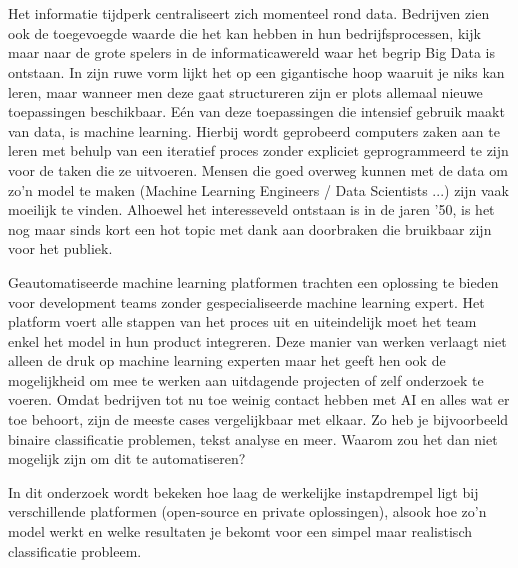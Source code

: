
\chapter{}
\label{ch:inleiding}

Het informatie tijdperk centraliseert zich momenteel rond data. Bedrijven zien ook de toegevoegde waarde die het kan hebben in hun bedrijfsprocessen, kijk maar naar de grote spelers in de informaticawereld waar het begrip Big Data is ontstaan. In zijn ruwe vorm lijkt het op een gigantische hoop waaruit je niks kan leren, maar wanneer men deze gaat structureren zijn er plots allemaal nieuwe toepassingen beschikbaar. 
Eén van deze toepassingen die intensief gebruik maakt van data, is machine learning. Hierbij wordt geprobeerd computers zaken aan te leren met behulp van een iteratief proces zonder expliciet geprogrammeerd te zijn voor de taken die ze uitvoeren. Mensen die goed overweg kunnen met de data om zo'n model te maken (Machine Learning Engineers / Data Scientists ...)  zijn vaak moeilijk te vinden. Alhoewel het interesseveld ontstaan is in de jaren '50, is het nog maar sinds kort een hot topic met dank aan doorbraken die bruikbaar zijn voor het publiek.

Geautomatiseerde machine learning platformen trachten een oplossing te bieden voor development teams zonder gespecialiseerde machine learning expert. Het platform voert alle stappen van het proces uit en uiteindelijk moet het team enkel het model in hun product integreren. Deze manier van werken verlaagt niet alleen de druk op machine learning experten maar het geeft hen ook de mogelijkheid om mee te werken aan uitdagende projecten of zelf onderzoek te voeren. Omdat bedrijven tot nu toe weinig contact hebben met AI en alles wat er toe behoort, zijn de meeste cases vergelijkbaar met elkaar. Zo heb je bijvoorbeeld binaire classificatie problemen, tekst analyse en meer. Waarom zou het dan niet mogelijk zijn om dit te automatiseren? 

In dit onderzoek wordt bekeken hoe laag de werkelijke instapdrempel ligt bij verschillende platformen (open-source en private oplossingen), alsook hoe zo'n model werkt en welke resultaten je bekomt voor een simpel maar realistisch classificatie probleem.

\section{}
\label{sec:probleemstelling}

